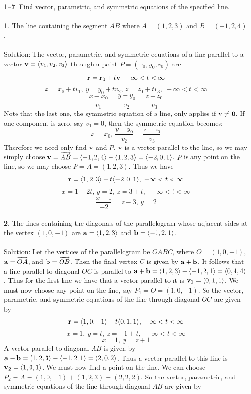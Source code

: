 \documentclass[12pt]{amsbook}
\newcommand{\la}{\langle}
\newcommand{\ra}{\rangle}
\begin{document}
\noindent
{\small\bf 1}--{\small\bf 7}. Find vector, parametric, and symmetric
equations of the specified line.
\\
\\
{\small\bf 1}. The line containing the segment $AB$ where
$A=(1,2,3)$ and $B=(-1,2,4)$.\\
\\
{\sc Solution}: The vector, parametric, and symmetric equations of a line parallel to a vector ${\bf v}=\la v_1,v_2,v_3\ra$ through a point $P=(x_0,y_0,z_0)$ are
$${\bf r} = {\bf r}_0 +t{\bf v} \ -\infty<t<\infty$$
$$x=x_0+tv_1, \ y=y_0+tv_2, \ z=z_0+tv_3, \ -\infty<t<\infty$$
$$\frac{x-x_0}{v_1}= \frac{y-y_0}{v_2}= \frac{z-z_0}{v_3}$$
Note that the last one, the symmetric equation of a line, only applies if ${\bf v}\neq {\bf 0}$. If one component is zero, say $v_1=0$, then the symmetric equation becomes:
 $$x=x_0, \ \frac{y-y_0}{v_2}= \frac{z-z_0}{v_3}$$
 Therefore we need only find $\bf v$ and $P$. ${\bf v}$ is a vector parallel to the line, so we may simply choose ${\bf v}=\overrightarrow{AB}=\la -1,2,4\ra - \la 1,2,3 \ra = \la -2,0,1\ra$. $P$ is any point on the line, so we may choose $P=A=(1,2,3)$. Thus we have
 $${\bf r} = \la 1,2,3\ra +t\la -2,0,1\ra, \ -\infty<t<\infty$$
 $$x=1-2t, \ y=2, \ z=3+t, \ -\infty<t<\infty$$
 $$\frac{x-1}{-2}= z-3, \ y=2$$
 \\
 {\small\bf 2}. The lines containing the diagonals of the parallelogram 
whose adjacent sides at the vertex $(1,0,-1)$ are ${\bf a}= 
\la 1,2,3\ra$ and ${\bf b}=\la -1,2,1\ra$.\\
\\
{\sc Solution}: Let the vertices of the parallelogram be $OABC$, where $O=(1,0,-1)$, ${\bf a}=\overrightarrow{OA}$, and ${\bf b}=\overrightarrow{OB}$. Then the final vertex $C$ is given by ${\bf a}+{\bf b}$. It follows that a line parallel to diagonal $OC$ is parallel to ${\bf a}+{\bf b}=\la 1,2,3\ra+\la -1,2,1\ra=\la 0,4,4 \ra$. Thus for the first line we have that a vector parallel to it is ${\bf v}_1=\la 0,1,1 \ra$. We must now choose any point on the line, say $P_1=O=(1,0,-1)$. So the vector, parametric, and symmetric equations of the line through diagonal $OC$ are given by
 $${\bf r} = \la 1,0,-1\ra +t\la 0,1,1\ra, \ -\infty<t<\infty$$
 $$x=1, \ y=t, \ z=-1+t, \ -\infty<t<\infty$$
 $$x=1, \  y=z+1$$
 A vector parallel to diagonal $AB$ is given by ${\bf a}-{\bf b}=\la 1,2,3\ra-\la -1,2,1 \ra = \la 2, 0, 2 \ra$. Thus a vector parallel to this line is ${\bf v}_2=\la 1,0,1 \ra$. We must now find a point on the line. We can choose $P_2=A=(1,0,-1)+(1,2,3)=(2,2,2)$. So the vector, parametric, and symmetric equations of the line through diagonal $AB$ are given by
\end{document}
